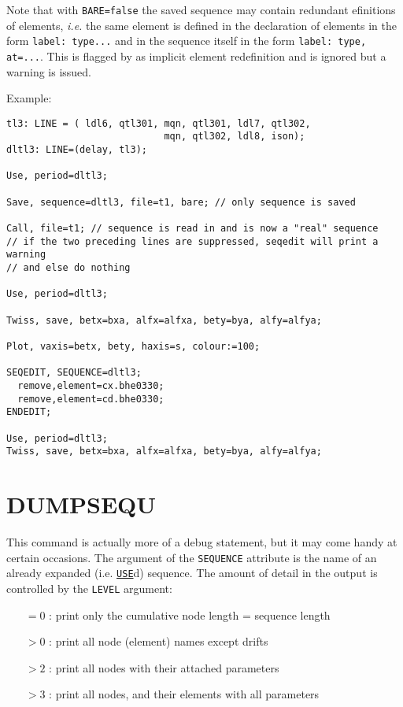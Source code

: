  
Note that with \texttt{BARE=false} the saved sequence may contain redundant 
efinitions of elements, \textsl{i.e.} the same element is defined in the
declaration  of elements in the form \texttt{label:\ type...} and in the
sequence itself in the form \texttt{label:\ type, at=...}. This is
flagged by \madx as implicit element redefinition and is ignored but a
warning is issued.  

Example:  
\begin{verbatim}
tl3: LINE = ( ldl6, qtl301, mqn, qtl301, ldl7, qtl302,
                            mqn, qtl302, ldl8, ison);
dltl3: LINE=(delay, tl3);

Use, period=dltl3;

Save, sequence=dltl3, file=t1, bare; // only sequence is saved

Call, file=t1; // sequence is read in and is now a "real" sequence
// if the two preceding lines are suppressed, seqedit will print a warning
// and else do nothing

Use, period=dltl3;

Twiss, save, betx=bxa, alfx=alfxa, bety=bya, alfy=alfya;

Plot, vaxis=betx, bety, haxis=s, colour:=100;

SEQEDIT, SEQUENCE=dltl3;
  remove,element=cx.bhe0330;
  remove,element=cd.bhe0330;
ENDEDIT;

Use, period=dltl3;
Twiss, save, betx=bxa, alfx=alfxa, bety=bya, alfy=alfya;
\end{verbatim}


\section{DUMPSEQU}
\label{sec:dumpsequ}
This command is actually more of a debug statement, but it may come handy at certain
occasions. The argument of the \texttt{SEQUENCE} attribute is the name of an
already expanded (i.e. \hyperref[sec:use]{\texttt{USE}}d) sequence. The amount of 
detail in the output is controlled by the \texttt{LEVEL} argument:
\begin{itemize}
\item[$=0$ : ]    print only the cumulative node length = sequence length
\item[$>0$ : ]    print all node (element) names except drifts
\item[$>2$ : ]    print all nodes with their attached parameters
\item[$>3$ : ]    print all nodes, and their elements with all parameters
\end{itemize}

